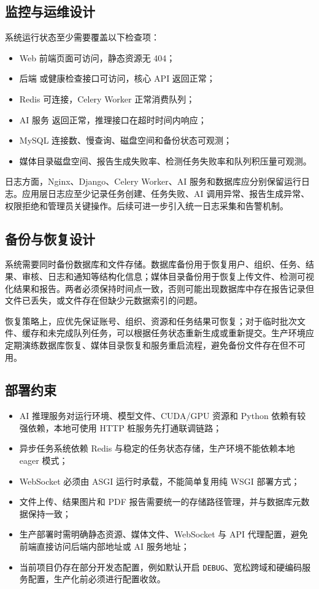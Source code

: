 \subsection{监控与运维设计}
系统运行状态至少需要覆盖以下检查项：
\begin{itemize}[leftmargin=2em]
    \item Web 前端页面可访问，静态资源无 404；
    \item 后端  或健康检查接口可访问，核心 API 返回正常；
    \item Redis 可连接，Celery Worker 正常消费队列；
    \item AI 服务  返回正常，推理接口在超时时间内响应；
    \item MySQL 连接数、慢查询、磁盘空间和备份状态可观测；
    \item 媒体目录磁盘空间、报告生成失败率、检测任务失败率和队列积压量可观测。
\end{itemize}

日志方面，Nginx、Django、Celery Worker、AI 服务和数据库应分别保留运行日志。应用层日志应至少记录任务创建、任务失败、AI 调用异常、报告生成异常、权限拒绝和管理员关键操作。后续可进一步引入统一日志采集和告警机制。

\subsection{备份与恢复设计}
系统需要同时备份数据库和文件存储。数据库备份用于恢复用户、组织、任务、结果、审核、日志和通知等结构化信息；媒体目录备份用于恢复上传文件、检测可视化结果和报告。两者必须保持时间点一致，否则可能出现数据库中存在报告记录但文件已丢失，或文件存在但缺少元数据索引的问题。

恢复策略上，应优先保证账号、组织、资源和任务结果可恢复；对于临时批次文件、缓存和未完成队列任务，可以根据任务状态重新生成或重新提交。生产环境应定期演练数据库恢复、媒体目录恢复和服务重启流程，避免备份文件存在但不可用。

\subsection{部署约束}
\begin{itemize}[leftmargin=2em]
    \item AI 推理服务对运行环境、模型文件、CUDA/GPU 资源和 Python 依赖有较强依赖，本地可使用 HTTP 桩服务先打通联调链路；
    \item 异步任务系统依赖 Redis 与稳定的任务状态存储，生产环境不能依赖本地 eager 模式；
    \item WebSocket 必须由 ASGI 运行时承载，不能简单复用纯 WSGI 部署方式；
    \item 文件上传、结果图片和 PDF 报告需要统一的存储路径管理，并与数据库元数据保持一致；
    \item 生产部署时需明确静态资源、媒体文件、WebSocket 与 API 代理配置，避免前端直接访问后端内部地址或 AI 服务地址；
    \item 当前项目仍存在部分开发态配置，例如默认开启 \texttt{DEBUG}、宽松跨域和硬编码服务配置，生产化前必须进行配置收敛。
\end{itemize}

